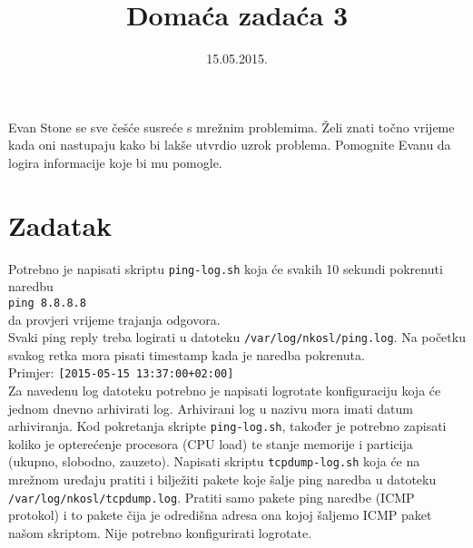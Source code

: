 \documentclass[12pt,a4paper]{article}
\begin{document}
	\title{Domaća zadaća 3}
	\date{\vspace{-5ex} 15.05.2015.}
	\maketitle
	Evan Stone se sve češće susreće s mrežnim problemima. Želi znati točno vrijeme kada oni nastupaju kako bi lakše utvrdio uzrok problema. Pomognite Evanu da logira informacije koje bi mu pomogle.\\
	\section*{Zadatak}
	Potrebno je napisati skriptu \texttt{ping-log.sh} koja će svakih 10 sekundi pokrenuti naredbu\\
	\hspace*{3em} \texttt{ping 8.8.8.8}\\
	da provjeri vrijeme trajanja odgovora.\\
	Svaki ping reply treba logirati u datoteku \texttt{/var/log/nkosl/ping.log}. Na početku svakog retka mora pisati timestamp kada je naredba pokrenuta.\\
	\hspace*{3em} Primjer: \texttt{[2015-05-15 13:37:00+02:00]}\\
	Za navedenu log datoteku potrebno je napisati logrotate konfiguraciju koja će jednom dnevno arhivirati log. Arhivirani log u nazivu mora imati datum arhiviranja.
	\newline
	\newline
	Kod pokretanja skripte \texttt{ping-log.sh}, također je potrebno zapisati koliko je opterećenje procesora (CPU load) te stanje memorije i particija (ukupno, slobodno, zauzeto).
	\newline
	\newline
	Napisati skriptu \texttt{tcpdump-log.sh} koja će na mrežnom uređaju pratiti i bilježiti pakete koje šalje ping naredba u datoteku \texttt{/var/log/nkosl/tcpdump.log}. Pratiti samo pakete ping naredbe (ICMP protokol) i to pakete čija je odredišna adresa ona kojoj šaljemo ICMP paket našom skriptom. Nije potrebno konfigurirati logrotate. 	
\end{document}
